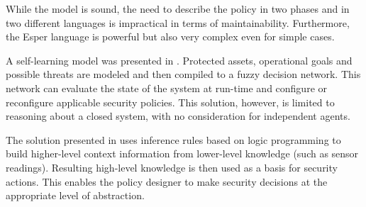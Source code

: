 While the model is sound, the need to describe the policy in two phases and in two
different languages is impractical in terms of maintainability. Furthermore, the Esper
language is powerful but also very complex even for simple cases.

A self-learning model was presented in \citep{adaptivesec-bashar2012}. Protected assets,
operational goals and possible threats are modeled and then compiled to a fuzzy decision
network. This network can evaluate the state of the system at run-time and configure or
reconfigure applicable security policies. This solution, however, is limited to
reasoning about a closed system, with no consideration for independent agents.

The solution presented in \citep{saleemi_framework_2011} uses inference rules based on
logic programming to build higher-level context information from lower-level knowledge
(such as sensor readings). Resulting high-level knowledge is then used as a basis for
security actions. This enables the policy designer to make security decisions at the
appropriate level of abstraction.
